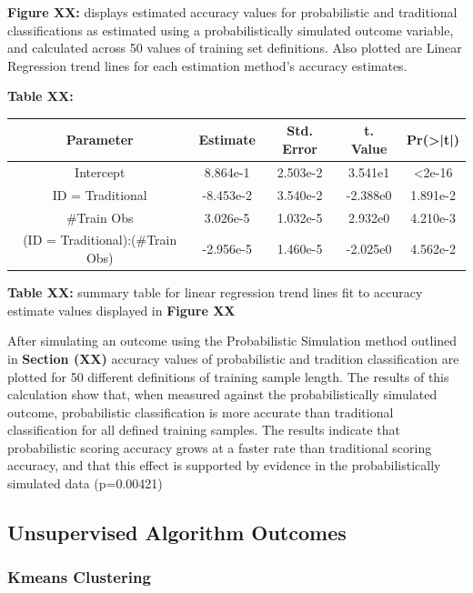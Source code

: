 \documentclass[12pt,]{article}
\begin{document}
\textbf{Figure XX:} displays estimated accuracy values for probabilistic
and traditional classifications as estimated using a probabilistically
simulated outcome variable, and calculated across 50 values of training
set definitions. Also plotted are Linear Regression trend lines for each
estimation method's accuracy estimates.

\textbf{Table XX:}

\begin{center}
\begin{tabular}{|c|c|c|c|c|}
\hline
Parameter                      & Estimate  & Std. Error & t. Value  & Pr(>|t|) \\
\hline
\hline
Intercept                      &  8.864e-1 &  2.503e-2  &  3.541e1  & <2e-16   \\
\hline
ID = Traditional               & -8.453e-2 &  3.540e-2  & -2.388e0  & 1.891e-2 \\
\hline
\#Train Obs                    &  3.026e-5 &  1.032e-5  &  2.932e0  & 4.210e-3 \\
\hline
(ID = Traditional):(\#Train Obs) &  -2.956e-5 &  1.460e-5  &  -2.025e0 & 4.562e-2 \\
\hline
\end{tabular}
\end{center}

\textbf{Table XX:} summary table for linear regression trend lines fit
to accuracy estimate values displayed in \textbf{Figure XX}

After simulating an outcome using the Probabilistic Simulation method
outlined in \textbf{Section (XX)} accuracy values of probabilistic and
tradition classification are plotted for 50 different definitions of
training sample length. The results of this calculation show that, when
measured against the probabilistically simulated outcome, probabilistic
classification is more accurate than traditional classification for all
defined training samples. The results indicate that probabilistic
scoring accuracy grows at a faster rate than traditional scoring
accuracy, and that this effect is supported by evidence in the
probabilistically simulated data (p=0.00421)

\hypertarget{unsupervised-algorithm-outcomes}{%
\subsection{Unsupervised Algorithm
Outcomes}\label{unsupervised-algorithm-outcomes}}

\hypertarget{kmeans-clustering-1}{%
\subsubsection{Kmeans Clustering}\label{kmeans-clustering-1}}
\end{document}
